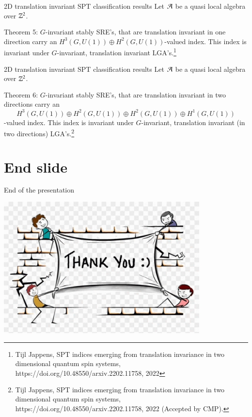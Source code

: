 \documentclass{beamer}
\begin{document}
\begin{frame}{2D translation invariant SPT classification results}
	Let $\AA$ be a quasi local algebra over $\ZZ^2$.
	\begin{block}{Theorem 5:}
		$G$-invariant stably SRE's, that are translation invariant in one direction carry an $H^3(G,U(1))\oplus H^2(G,U(1))$-valued index. This index is invariant under $G$-invariant, translation invariant LGA's.\footnote{Tijl Jappens, SPT indices emerging from translation invariance in two dimensional quantum spin systems, https://doi.org/10.48550/arxiv.2202.11758, 2022}
	\end{block}
\end{frame}

\begin{frame}{2D translation invariant SPT classification results}
	Let $\AA$ be a quasi local algebra over $\ZZ^2$.
	\begin{block}{Theorem 6:}
		$G$-invariant stably SRE's, that are translation invariant in two directions carry an
		\[H^3(G,U(1))\oplus H^2(G,U(1))\oplus H^2(G,U(1))\oplus H^1(G,U(1))\]
		-valued index. This index is invariant under $G$-invariant, translation invariant (in two directions) LGA's.\footnote{Tijl Jappens, SPT indices emerging from translation invariance in two dimensional quantum spin systems, https://doi.org/10.48550/arxiv.2202.11758, 2022 (Accepted by CMP).}
	\end{block}
\end{frame}

\section{End slide}

\begin{frame}{End of the presentation}
	\begin{center}
		\includegraphics[width=0.8\textwidth]{Figures/thank-you.png}
	\end{center}
\end{frame}
\end{document}
